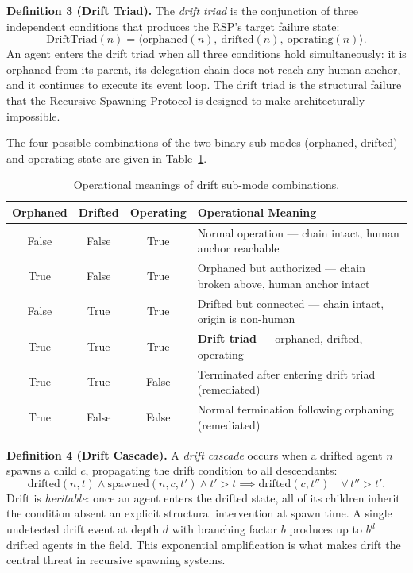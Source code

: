 \medskip
\noindent\textbf{Definition 3 (Drift Triad).}
The \emph{drift triad} is the conjunction of three independent conditions that produces the RSP's target failure state:
\begin{equation}
\mathrm{DriftTriad}(n) = \langle \mathrm{orphaned}(n),\ \mathrm{drifted}(n),\ \mathrm{operating}(n) \rangle.
\label{eq:drift-triad}
\end{equation}
An agent enters the drift triad when all three conditions hold simultaneously: it is orphaned from its parent, its delegation chain does not reach any human anchor, and it continues to execute its event loop. The drift triad is the structural failure that the Recursive Spawning Protocol is designed to make architecturally impossible.

The four possible combinations of the two binary sub-modes (orphaned, drifted) and operating state are given in Table~\ref{tab:drift-submodes}.

\begin{table}[h]
\centering
\begin{tabular}{c|c|c|p{5cm}}
\textbf{Orphaned} & \textbf{Drifted} & \textbf{Operating} & \textbf{Operational Meaning} \\ \hline
False & False & True  & Normal operation — chain intact, human anchor reachable \\
True  & False & True  & Orphaned but authorized — chain broken above, human anchor intact \\
False & True  & True  & Drifted but connected — chain intact, origin is non-human \\
True  & True  & True  & \textbf{Drift triad} — orphaned, drifted, operating \\
True  & True  & False & Terminated after entering drift triad (remediated) \\
True  & False & False & Normal termination following orphaning (remediated)
\end{tabular}
\caption{Operational meanings of drift sub-mode combinations.}
\label{tab:drift-submodes}
\end{table}

\medskip
\noindent\textbf{Definition 4 (Drift Cascade).}
A \emph{drift cascade} occurs when a drifted agent $n$ spawns a child $c$, propagating the drift condition to all descendants:
\begin{equation}
\mathrm{drifted}(n, t) \land \mathrm{spawned}(n, c, t') \land t' > t \implies \mathrm{drifted}(c, t'')\quad \forall\, t'' > t'.
\label{eq:drift-cascade}
\end{equation}
Drift is \emph{heritable}: once an agent enters the drifted state, all of its children inherit the condition absent an explicit structural intervention at spawn time. A single undetected drift event at depth $d$ with branching factor $b$ produces up to $b^d$ drifted agents in the field. This exponential amplification is what makes drift the central threat in recursive spawning systems.

